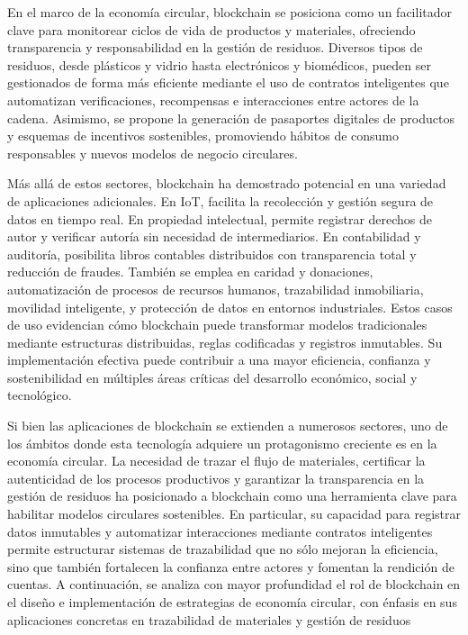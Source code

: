 En el marco de la economía circular, blockchain se posiciona como un facilitador clave para monitorear ciclos de vida de productos y materiales, ofreciendo transparencia y responsabilidad en la gestión de residuos. Diversos tipos de residuos, desde plásticos y vidrio hasta electrónicos y biomédicos, pueden ser gestionados de forma más eficiente mediante el uso de contratos inteligentes que automatizan verificaciones, recompensas e interacciones entre actores de la cadena. Asimismo, se propone la generación de pasaportes digitales de productos y esquemas de incentivos sostenibles, promoviendo hábitos de consumo responsables y nuevos modelos de negocio circulares.

Más allá de estos sectores, blockchain ha demostrado potencial en una variedad de aplicaciones adicionales. En IoT, facilita la recolección y gestión segura de datos en tiempo real. En propiedad intelectual, permite registrar derechos de autor y verificar autoría sin necesidad de intermediarios. En contabilidad y auditoría, posibilita libros contables distribuidos con transparencia total y reducción de fraudes. También se emplea en caridad y donaciones, automatización de procesos de recursos humanos, trazabilidad inmobiliaria, movilidad inteligente, y protección de datos en entornos industriales. Estos casos de uso evidencian cómo blockchain puede transformar modelos tradicionales mediante estructuras distribuidas, reglas codificadas y registros inmutables. Su implementación efectiva puede contribuir a una mayor eficiencia, confianza y sostenibilidad en múltiples áreas críticas del desarrollo económico, social y tecnológico.

Si bien las aplicaciones de blockchain se extienden a numerosos sectores, uno de los ámbitos donde esta tecnología adquiere un protagonismo creciente es en la economía circular. La necesidad de trazar el flujo de materiales, certificar la autenticidad de los procesos productivos y garantizar la transparencia en la gestión de residuos ha posicionado a blockchain como una herramienta clave para habilitar modelos circulares sostenibles. En particular, su capacidad para registrar datos inmutables y automatizar interacciones mediante contratos inteligentes permite estructurar sistemas de trazabilidad que no sólo mejoran la eficiencia, sino que también fortalecen la confianza entre actores y fomentan la rendición de cuentas. A continuación, se analiza con mayor profundidad el rol de blockchain en el diseño e implementación de estrategias de economía circular, con énfasis en sus aplicaciones concretas en trazabilidad de materiales y gestión de residuos


